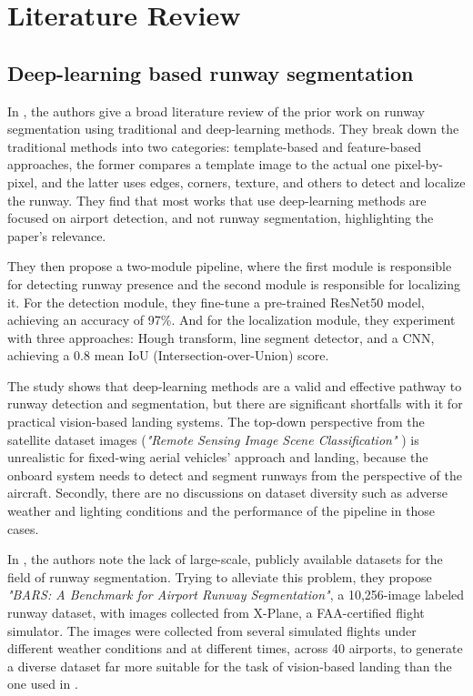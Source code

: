 \chapter{Literature Review}

\section{Deep-learning based runway segmentation}

In \cite{akbar_runway_2019}, the authors give a broad literature review of the
prior work on runway segmentation using traditional and deep-learning methods.
They break down the traditional methods into two categories: template-based and
feature-based approaches, the former compares a template image to the actual one
pixel-by-pixel, and the latter uses edges, corners, texture, and others to
detect and localize the runway. They find that most works that use deep-learning
methods are focused on airport detection, and not runway segmentation,
highlighting the paper's relevance.

They then propose a two-module pipeline, where the first module is responsible
for detecting runway presence and the second module is responsible for
localizing it. For the detection module, they fine-tune a pre-trained ResNet50 model, achieving an accuracy of 97\%. And for the localization module, they experiment with three approaches: Hough transform, line segment detector, and a CNN, 
achieving a 0.8 mean IoU (Intersection-over-Union) score.

The study shows that deep-learning methods are a valid and effective pathway to
runway detection and segmentation, but there are significant shortfalls with it
for practical vision-based landing systems. The top-down perspective from the
satellite dataset images (\emph{"Remote Sensing Image Scene Classification"} \cite{cheng_remote_2017}) is unrealistic for fixed-wing aerial vehicles' approach and landing, because the onboard system needs to detect and segment runways from the perspective of the aircraft. Secondly, there are no discussions on dataset diversity such as adverse weather and lighting conditions and the performance of the pipeline in those cases.

In \cite{chen_bars_2023}, the authors note the lack of large-scale, publicly available datasets for the field of runway segmentation. Trying to alleviate this problem, they propose \emph{"BARS: A Benchmark for Airport Runway Segmentation"}, a 10,256-image labeled runway dataset, with images collected from X-Plane, a FAA-certified flight simulator. The images were collected from several simulated flights under different weather conditions and at different times, across 40 airports, to generate a diverse dataset far more suitable for the task of vision-based landing than the one used in \cite{akbar_runway_2019}.


